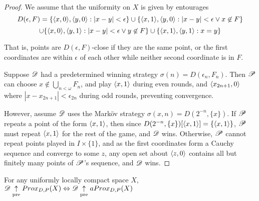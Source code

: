 \begin{proof}
  We assume that the uniformity on $X$ is given by entourages 
  \[
    D(\epsilon,F) = 
    \{\langle x,0\rangle,\langle y,0\rangle: |x-y|<\epsilon \}
      \cup
    \{\langle x,1\rangle,\langle y,0\rangle: |x-y|<\epsilon \vee x\not\in F\}
  \]
  \[
      \cup
    \{\langle x,0\rangle,\langle y,1\rangle: |x-y|<\epsilon \vee y\not\in F\}
      \cup
    \{\langle x,1\rangle,\langle y,1\rangle: x=y\}
  \]

  That is, points are $D(\epsilon,F)$-close if they are the same point, or 
  the first coordinates are within $\epsilon$ of each other while neither 
  second coordinate is in $F$.

  Suppose $\mathscr{D}$ had a predetermined winning strategy 
  $\sigma(n)=D(\epsilon_n,F_n)$. Then 
  $\mathscr{P}$ can choose $x\not\in \bigcup_{n<\omega} F_n$, and play $\langle x,1\rangle$ 
  during even rounds, and $\langle x_{2n+1},0\rangle$ where $|x-x_{2n+1}|<\epsilon_{2n}$
  during odd rounds, preventing convergence.

  However, assume $\mathscr{D}$ uses the Mark\"ov strategy 
  $\sigma(x,n)=D(2^{-n},\{x\})$.
  If $\mathscr{P}$ repeats a point of the form $\langle x,1\rangle$, then since 
  $D(2^{-n},\{x\})[\langle x,1\rangle]=\{\langle x,1\rangle\}$, $\mathscr{P}$ must repeat $\langle x,1\rangle$ for
  the rest of the game, and $\mathscr{D}$ wins. Otherwise, $\mathscr{P}$ cannot repeat 
  points played in $I\times\{1\}$, and as the first
  coordinates form a Cauchy sequence and converge to some $z$, any open set
  about $\langle z,0\rangle$ contains all but finitely many points of $\mathscr{P}$'s sequence,
  and $\mathscr{D}$ wins.
\end{proof}

\begin{theorem}
  For any uniformly locally compact space $X$,
      $\mathscr{D}\underset{\text{pre}}{\uparrow} Prox_{D,P}(X) \Leftrightarrow \mathscr{D}\underset{\text{pre}}{\uparrow} aProx_{D,P}(X)$
\end{theorem}


